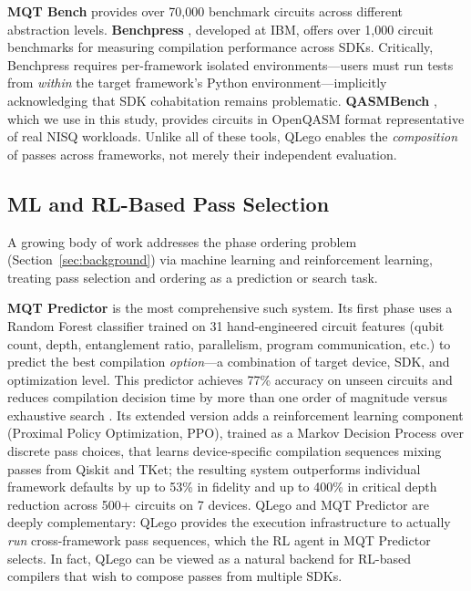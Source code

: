 \documentclass[conference]{IEEEtran}
\begin{document}
\textbf{MQT Bench} \cite{quetschlich2023mqtbench} provides over 70,000 benchmark circuits across different abstraction levels. \textbf{Benchpress} \cite{benchpress}, developed at IBM, offers over 1,000 circuit benchmarks for measuring compilation performance across SDKs. Critically, Benchpress requires per-framework isolated environments—users must run tests from \textit{within} the target framework's Python environment—implicitly acknowledging that SDK cohabitation remains problematic. \textbf{QASMBench} \cite{qasmbench}, which we use in this study, provides circuits in OpenQASM format representative of real NISQ workloads. Unlike all of these tools, QLego enables the \textit{composition} of passes across frameworks, not merely their independent evaluation.

\subsection{ML and RL-Based Pass Selection}
\label{subsec:mlrl}

A growing body of work addresses the phase ordering problem (Section~\ref{sec:background}) via machine learning and reinforcement learning, treating pass selection and ordering as a prediction or search task.

\textbf{MQT Predictor} \cite{quetschlich2022predictor, quetschlich2024mqtpredictor} is the most comprehensive such system. Its first phase uses a Random Forest classifier trained on 31 hand-engineered circuit features (qubit count, depth, entanglement ratio, parallelism, program communication, etc.) to predict the best compilation \textit{option}—a combination of target device, SDK, and optimization level. This predictor achieves 77\% accuracy on unseen circuits and reduces compilation decision time by more than one order of magnitude versus exhaustive search \cite{quetschlich2022predictor}. Its extended version \cite{quetschlich2024mqtpredictor} adds a reinforcement learning component (Proximal Policy Optimization, PPO), trained as a Markov Decision Process over discrete pass choices, that learns device-specific compilation sequences mixing passes from Qiskit and TKet; the resulting system outperforms individual framework defaults by up to 53\% in fidelity and up to 400\% in critical depth reduction across 500+ circuits on 7 devices. QLego and MQT Predictor are deeply complementary: QLego provides the execution infrastructure to actually \textit{run} cross-framework pass sequences, which the RL agent in MQT Predictor selects. In fact, QLego can be viewed as a natural backend for RL-based compilers that wish to compose passes from multiple SDKs.
\end{document}
